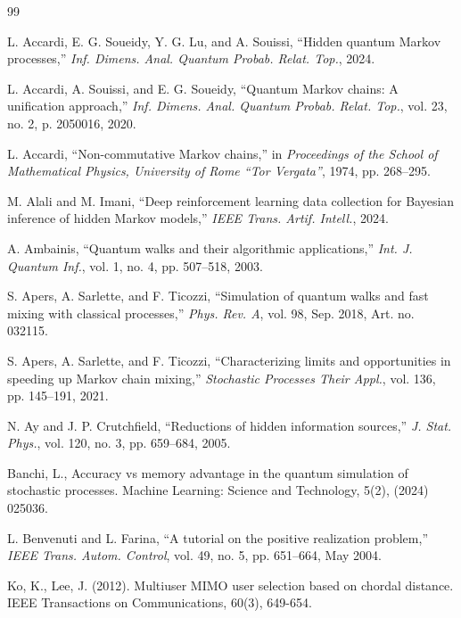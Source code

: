 \documentclass[12pt, reco]{article}
\begin{document}
\begin{thebibliography}{99}



L. Accardi, E. G. Soueidy, Y. G. Lu, and A. Souissi, ``Hidden quantum Markov processes,'' \emph{Inf. Dimens. Anal. Quantum Probab. Relat. Top.}, 2024.



L. Accardi, A. Souissi, and E. G. Soueidy, ``Quantum Markov chains: A unification approach,'' \emph{Inf. Dimens. Anal. Quantum Probab. Relat. Top.}, vol. 23, no. 2, p. 2050016, 2020.

L. Accardi, ``Non-commutative Markov chains,'' in \emph{Proceedings of the School of Mathematical Physics, University of Rome ``Tor Vergata''}, 1974, pp. 268--295.

M. Alali and M. Imani, ``Deep reinforcement learning data collection for Bayesian inference of hidden Markov models,'' \emph{IEEE Trans. Artif. Intell.}, 2024.

A. Ambainis, ``Quantum walks and their algorithmic applications,'' \emph{Int. J. Quantum Inf.}, vol. 1, no. 4, pp. 507--518, 2003.

S. Apers, A. Sarlette, and F. Ticozzi, ``Simulation of quantum walks and fast mixing with classical processes,'' \emph{Phys. Rev. A}, vol. 98, Sep. 2018, Art. no. 032115.

S. Apers, A. Sarlette, and F. Ticozzi, ``Characterizing limits and opportunities in speeding up Markov chain mixing,'' \emph{Stochastic Processes Their Appl.}, vol. 136, pp. 145--191, 2021.


N. Ay and J. P. Crutchfield, ``Reductions of hidden information sources,'' \emph{J. Stat. Phys.}, vol. 120, no. 3, pp. 659--684, 2005.

 Banchi, L., Accuracy vs memory advantage in the quantum simulation of stochastic processes. Machine Learning: Science and Technology, 5(2),  (2024) 025036.

L. Benvenuti and L. Farina, ``A tutorial on the positive realization problem,'' \emph{IEEE Trans. Autom. Control}, vol. 49, no. 5, pp. 651--664, May 2004.

 Ko, K.,   Lee, J. (2012). Multiuser MIMO user selection based on chordal distance. IEEE Transactions on Communications, 60(3), 649-654.


\end{thebibliography}
\end{document}
